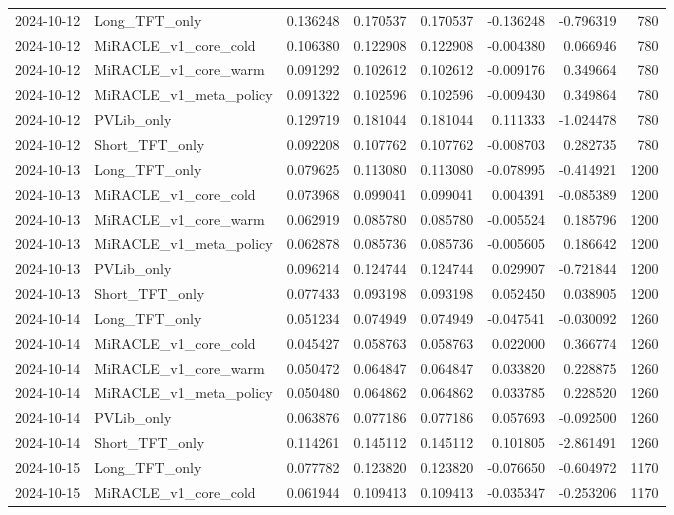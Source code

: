 \begin{tabular}{llrrrrrr}
2024-10-12 & Long_TFT_only & 0.136248 & 0.170537 & 0.170537 & -0.136248 & -0.796319 & 780 \\
2024-10-12 & MiRACLE_v1_core_cold & 0.106380 & 0.122908 & 0.122908 & -0.004380 & 0.066946 & 780 \\
2024-10-12 & MiRACLE_v1_core_warm & 0.091292 & 0.102612 & 0.102612 & -0.009176 & 0.349664 & 780 \\
2024-10-12 & MiRACLE_v1_meta_policy & 0.091322 & 0.102596 & 0.102596 & -0.009430 & 0.349864 & 780 \\
2024-10-12 & PVLib_only & 0.129719 & 0.181044 & 0.181044 & 0.111333 & -1.024478 & 780 \\
2024-10-12 & Short_TFT_only & 0.092208 & 0.107762 & 0.107762 & -0.008703 & 0.282735 & 780 \\
2024-10-13 & Long_TFT_only & 0.079625 & 0.113080 & 0.113080 & -0.078995 & -0.414921 & 1200 \\
2024-10-13 & MiRACLE_v1_core_cold & 0.073968 & 0.099041 & 0.099041 & 0.004391 & -0.085389 & 1200 \\
2024-10-13 & MiRACLE_v1_core_warm & 0.062919 & 0.085780 & 0.085780 & -0.005524 & 0.185796 & 1200 \\
2024-10-13 & MiRACLE_v1_meta_policy & 0.062878 & 0.085736 & 0.085736 & -0.005605 & 0.186642 & 1200 \\
2024-10-13 & PVLib_only & 0.096214 & 0.124744 & 0.124744 & 0.029907 & -0.721844 & 1200 \\
2024-10-13 & Short_TFT_only & 0.077433 & 0.093198 & 0.093198 & 0.052450 & 0.038905 & 1200 \\
2024-10-14 & Long_TFT_only & 0.051234 & 0.074949 & 0.074949 & -0.047541 & -0.030092 & 1260 \\
2024-10-14 & MiRACLE_v1_core_cold & 0.045427 & 0.058763 & 0.058763 & 0.022000 & 0.366774 & 1260 \\
2024-10-14 & MiRACLE_v1_core_warm & 0.050472 & 0.064847 & 0.064847 & 0.033820 & 0.228875 & 1260 \\
2024-10-14 & MiRACLE_v1_meta_policy & 0.050480 & 0.064862 & 0.064862 & 0.033785 & 0.228520 & 1260 \\
2024-10-14 & PVLib_only & 0.063876 & 0.077186 & 0.077186 & 0.057693 & -0.092500 & 1260 \\
2024-10-14 & Short_TFT_only & 0.114261 & 0.145112 & 0.145112 & 0.101805 & -2.861491 & 1260 \\
2024-10-15 & Long_TFT_only & 0.077782 & 0.123820 & 0.123820 & -0.076650 & -0.604972 & 1170 \\
2024-10-15 & MiRACLE_v1_core_cold & 0.061944 & 0.109413 & 0.109413 & -0.035347 & -0.253206 & 1170 \\

\end{tabular}
